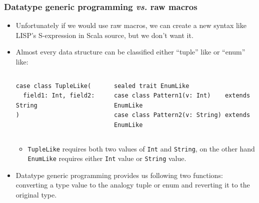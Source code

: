 \begin{frame}[fragile]
  \frametitle{Datatype generic programming \textit{vs.} raw macros}

  \begin{itemize}
    \item Unfortunately if we would use raw macros, we can create a new syntax like LISP's S-expression in Scala source,
    but we don't want it.

    \item Almost every data structure can be classified either ``tuple'' like or ``enum'' like:
    \begin{columns}
      \begin{column}{0.32\textwidth}
\begin{lstlisting}[style=scala]
case class TupleLike(
  field1: Int, field2: String
)
\end{lstlisting}
      \end{column}
      \begin{column}{0.5\textwidth}
\begin{lstlisting}[style=scala]
sealed trait EnumLike
case class Pattern1(v: Int)    extends EnumLike
case class Pattern2(v: String) extends EnumLike
\end{lstlisting}
      \end{column}
    \end{columns}
    \begin{itemize}
      \item \lstinline|TupleLike| requires both two values of \lstinline|Int| and \lstinline|String|,
      on the other hand \lstinline|EnumLike| requires either \lstinline|Int| value or \lstinline|String| value.
    \end{itemize}

    \item Datatype generic programming provides us following two functions: 
       converting a type value to the analogy tuple or enum and
       reverting it to the original type.
  \end{itemize}

\end{frame}

